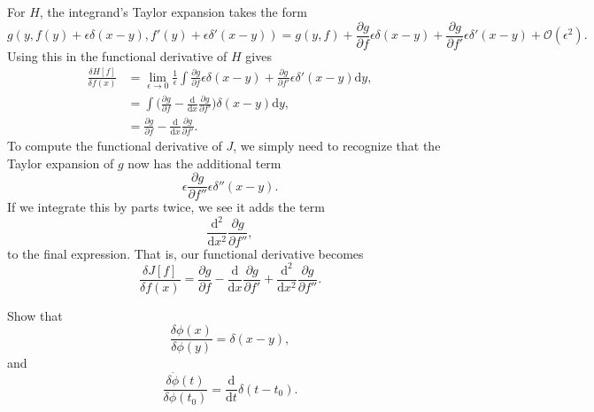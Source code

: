 \documentclass[../qft-for-the-gifted-amateur.tex]{subfiles}
\begin{document}
\begin{questions}
\begin{solution}
		For $H$, the integrand's Taylor expansion takes the form
		\[
			g(y, f(y) + \epsilon\delta(x - y), f'(y) + \epsilon\delta'(x - y)) = g(y, f) + \frac{\partial{g}}{\partial{f}}\epsilon\delta(x - y) + \frac{\partial{g}}{\partial{f'}}\epsilon\delta'(x - y) + \mathcal{O}(\epsilon^2).
		\]
		Using this in the functional derivative of $H$ gives
		\begin{align*}
			\frac{\delta{H}[f]}{\delta{f(x)}} &= \lim_{\epsilon\to0}\frac{1}{\epsilon}\int\frac{\partial{g}}{\partial{f}}\epsilon\delta(x - y) + \frac{\partial{g}}{\partial{f'}}\epsilon\delta'(x - y)\mathrm{d}y, \\
			&= \int \Big(\frac{\partial{g}}{\partial{f}} - \frac{\mathrm{d}}{\mathrm{d}x}\frac{\partial{g}}{\partial{f'}}\Big)\delta(x - y)\mathrm{d}y, \\
			&= \frac{\partial{g}}{\partial{f}} - \frac{\mathrm{d}}{\mathrm{d}x}\frac{\partial{g}}{\partial{f}'}.
		\end{align*}
		To compute the functional derivative of $J$, we simply need to recognize that the Taylor expansion of $g$ now has the additional term
		\[
			\epsilon\frac{\partial{g}}{\partial{f''}}\epsilon\delta''(x - y).
		\]
		If we integrate this by parts twice, we see it adds the term
		\[
			\frac{\mathrm{d}^2}{\mathrm{d}x^2}\frac{\partial{g}}{\partial{f''}},
		\]
		to the final expression. That is, our functional derivative becomes
		\[
			\frac{\delta{J}[f]}{\delta{f}(x)} = \frac{\partial{g}}{\partial{f}} - \frac{\mathrm{d}}{\mathrm{d}x}\frac{\partial{g}}{\partial{f'}} + \frac{\mathrm{d}^2}{\mathrm{d}x^2}\frac{\partial{g}}{\partial{f''}}.
		\]
	\end{solution}
	
	\question Show that
	\[
		\frac{\delta{\phi(x)}}{\delta{\phi(y)}} = \delta(x - y),
	\]
	and
	\[
		\frac{\delta\dot{\phi}(t)}{\delta\phi(t_0)} = \frac{\mathrm{d}}{\mathrm{d}t}\delta(t - t_0).
	\]
	

\end{questions}
\end{document}
